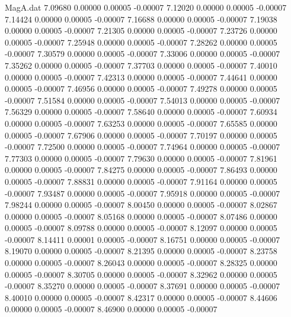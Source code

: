 \begin{filecontents}{MagA.dat}
   7.09680    0.00000    0.00005   -0.00007
   7.12020    0.00000    0.00005   -0.00007
   7.14424    0.00000    0.00005   -0.00007
   7.16688    0.00000    0.00005   -0.00007
   7.19038    0.00000    0.00005   -0.00007
   7.21305    0.00000    0.00005   -0.00007
   7.23726    0.00000    0.00005   -0.00007
   7.25948    0.00000    0.00005   -0.00007
   7.28262    0.00000    0.00005   -0.00007
   7.30579    0.00000    0.00005   -0.00007
   7.33006    0.00000    0.00005   -0.00007
   7.35262    0.00000    0.00005   -0.00007
   7.37703    0.00000    0.00005   -0.00007
   7.40010    0.00000    0.00005   -0.00007
   7.42313    0.00000    0.00005   -0.00007
   7.44641    0.00000    0.00005   -0.00007
   7.46956    0.00000    0.00005   -0.00007
   7.49278    0.00000    0.00005   -0.00007
   7.51584    0.00000    0.00005   -0.00007
   7.54013    0.00000    0.00005   -0.00007
   7.56329    0.00000    0.00005   -0.00007
   7.58640    0.00000    0.00005   -0.00007
   7.60934    0.00000    0.00005   -0.00007
   7.63253    0.00000    0.00005   -0.00007
   7.65585    0.00000    0.00005   -0.00007
   7.67906    0.00000    0.00005   -0.00007
   7.70197    0.00000    0.00005   -0.00007
   7.72500    0.00000    0.00005   -0.00007
   7.74964    0.00000    0.00005   -0.00007
   7.77303    0.00000    0.00005   -0.00007
   7.79630    0.00000    0.00005   -0.00007
   7.81961    0.00000    0.00005   -0.00007
   7.84275    0.00000    0.00005   -0.00007
   7.86493    0.00000    0.00005   -0.00007
   7.88831    0.00000    0.00005   -0.00007
   7.91164    0.00000    0.00005   -0.00007
   7.93487    0.00000    0.00005   -0.00007
   7.95918    0.00000    0.00005   -0.00007
   7.98244    0.00000    0.00005   -0.00007
   8.00450    0.00000    0.00005   -0.00007
   8.02867    0.00000    0.00005   -0.00007
   8.05168    0.00000    0.00005   -0.00007
   8.07486    0.00000    0.00005   -0.00007
   8.09788    0.00000    0.00005   -0.00007
   8.12097    0.00000    0.00005   -0.00007
   8.14411    0.00001    0.00005   -0.00007
   8.16751    0.00000    0.00005   -0.00007
   8.19070    0.00000    0.00005   -0.00007
   8.21395    0.00000    0.00005   -0.00007
   8.23758    0.00000    0.00005   -0.00007
   8.26043    0.00000    0.00005   -0.00007
   8.28325    0.00000    0.00005   -0.00007
   8.30705    0.00000    0.00005   -0.00007
   8.32962    0.00000    0.00005   -0.00007
   8.35270    0.00000    0.00005   -0.00007
   8.37691    0.00000    0.00005   -0.00007
   8.40010    0.00000    0.00005   -0.00007
   8.42317    0.00000    0.00005   -0.00007
   8.44606    0.00000    0.00005   -0.00007
   8.46900    0.00000    0.00005   -0.00007

\end{filecontents}
